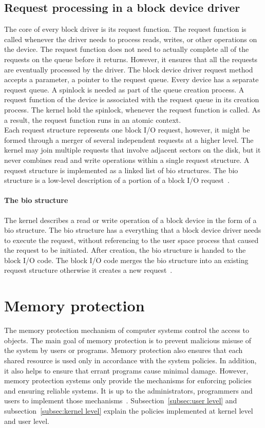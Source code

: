 \subsection*{Request processing in a block device driver}
\label{subsec:request queue}
The core of every block driver is its request function. The request function is called whenever the driver needs to process reads, writes, or other operations on the device. The request function does not need to actually complete all of the requests on the queue before it returns. However, it ensures that all the requests are eventually processed by the driver. The block device driver request method accepts a parameter, a pointer to the request queue. Every device has a separate request queue. A spinlock is needed as part of the queue creation process. A request function of the device is associated with the request queue in its creation process. The kernel hold the spinlock, whenever the request function is called. As a result, the request function runs in an atomic context.
\\[3mm]
Each request structure represents one block I/O request, however, it might be formed through a merger of several independent requests at a higher level.
The kernel may join multiple requests that involve adjacent sectors on the disk, but it never combines read and write operations within a single request structure. A request structure is implemented as a linked list of bio structures. The bio structure is a low-level description of a portion of a block I/O request~\cite{Corbet:2005:LDD:1209083}.

\paragraph{The bio structure}
The kernel describes a read or write operation of a block device in the form of a bio structure. The bio structure has a everything that a block device driver needs to execute the request, without referencing to the user space process that caused the request to be initiated. After creation, the bio structure is handed to the block I/O code. The block I/O code merges the bio structure into an existing request structure otherwise it creates a new request~\cite{Corbet:2005:LDD:1209083}. 

\section{Memory protection}
The memory protection mechanism of computer systems control the access to objects. The main goal of memory protection is to prevent malicious misuse of the system by users or programs. Memory protection also ensures that each shared resource is used only in accordance with the system policies. In addition, it also helps to ensure that errant programs cause minimal damage. However, memory protection systems only provide the mechanisms for enforcing policies and ensuring reliable systems. It is up to the administrators, programmers and users to implement those mechanisms~\cite{Galvin, Graham:1971:PPP:1478873.1478928}. Subsection~\ref{subsec:user level} and subsection~\ref{subsec:kernel level} explain the policies implemented at kernel level and user level. 

